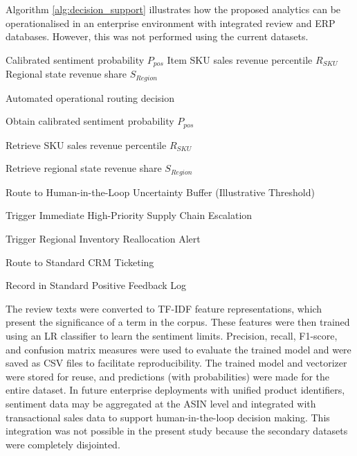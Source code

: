 \documentclass[authoryear,review,3p,times,12pt]{elsarticle}
\begin{document}
Algorithm \ref{alg:decision_support} illustrates how the proposed analytics can be operationalised in an enterprise environment with integrated review and ERP databases. However, this was not performed using the current datasets.

\begin{algorithm}
\caption{Reference Architecture for Enterprise Deployment}
\label{alg:decision_support}
\begin{algorithmic}[1]

\Require
\Statex Calibrated sentiment probability $P_{pos}$
\Statex Item SKU sales revenue percentile $R_{SKU}$
\Statex Regional state revenue share $S_{Region}$

\Ensure Automated operational routing decision


    \State Obtain calibrated sentiment probability $P_{pos}$

    \State Retrieve SKU sales revenue percentile $R_{SKU}$

    \State Retrieve regional state revenue share $S_{Region}$


        \State Route to Human-in-the-Loop Uncertainty Buffer (Illustrative Threshold)


        \State Trigger Immediate High-Priority Supply Chain Escalation


        \State Trigger Regional Inventory Reallocation Alert


        \State Route to Standard CRM Ticketing

    \Else

        \State Record in Standard Positive Feedback Log

    \EndIf

\EndFor

\end{algorithmic}
\end{algorithm}


The review texts were converted to TF-IDF feature representations, which present the significance of a term in the corpus. These features were then trained using an LR classifier to learn the sentiment limits. Precision, recall, F1-score, and confusion matrix measures were used to evaluate the trained model and were saved as CSV files to facilitate reproducibility. The trained model and vectorizer were stored for reuse, and predictions (with probabilities) were made for the entire dataset. In future enterprise deployments with unified product identifiers, sentiment data may be aggregated at the ASIN level and integrated with transactional sales data to support human-in-the-loop decision making. This integration was not possible in the present study because the secondary datasets were completely disjointed.
\end{document}
